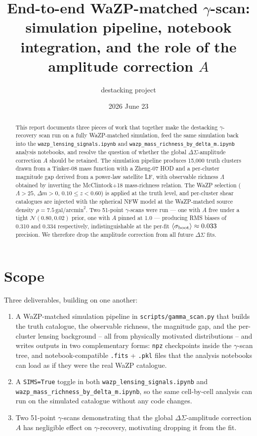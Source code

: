 \documentclass[11pt,a4paper]{article}
\title{\textbf{End-to-end WaZP-matched $\gamma$-scan:\\
simulation pipeline, notebook integration, and the role of the
amplitude correction $A$}}
\author{destacking project}
\date{2026 June 23}
\newcommand{\DS}{\Delta\Sigma}
\begin{document}
\maketitle

\begin{abstract}
This report documents three pieces of work that together make the
destacking $\gamma$-recovery scan run on a fully WaZP-matched
simulation, feed the same simulation back into the
\verb|wazp_lensing_signals.ipynb| and \verb|wazp_mass_richness_by_delta_m.ipynb|
analysis notebooks, and resolve the question of whether the global
$\DS$-amplitude correction $A$ should be retained. The simulation
pipeline produces 15,000 truth clusters drawn from a Tinker-08 mass
function with a Zheng-07 HOD and a per-cluster magnitude gap derived
from a power-law satellite LF, with observable richness $\Lambda$
obtained by inverting the McClintock+18 mass-richness relation. The
WaZP selection ($\Lambda > 25$, $\Delta m > 0$, $0.10 \le z < 0.60$) is
applied at the truth level, and per-cluster shear catalogues are
injected with the spherical NFW model at the WaZP-matched source
density $\rho = 7.5\,\mathrm{gal}/\mathrm{arcmin}^{2}$. Two 51-point
$\gamma$-scans were run --- one with $A$ free under a tight
$\mathcal{N}(0.80, 0.02)$ prior, one with $A$ pinned at 1.0 ---
producing RMS biases of 0.310 and 0.334 respectively, indistinguishable
at the per-fit $\langle\sigma_{\rm boot}\rangle \approx 0.033$
precision. We therefore drop the amplitude correction from all future
$\DS$ fits.
\end{abstract}

\tableofcontents
\bigskip


\section{Scope}
\label{sec:scope}

Three deliverables, building on one another:

\begin{enumerate}
\item A WaZP-matched simulation pipeline in
      \verb|scripts/gamma_scan.py| that builds the truth catalogue, the
      observable richness, the magnitude gap, and the per-cluster
      lensing background -- all from physically motivated distributions
      -- and writes outputs in two complementary forms: \texttt{npz}
      checkpoints inside the $\gamma$-scan tree, and notebook-compatible
      \texttt{.fits} + \texttt{.pkl} files that the analysis notebooks
      can load as if they were the real WaZP catalogue.
\item A \verb|SIMS=True| toggle in both
      \verb|wazp_lensing_signals.ipynb| and
      \verb|wazp_mass_richness_by_delta_m.ipynb|, so the same
      cell-by-cell analysis can run on the simulated catalogue without
      any code changes.
\item Two 51-point $\gamma$-scans demonstrating that the global
      $\DS$-amplitude correction $A$ has negligible effect on
      $\gamma$-recovery, motivating dropping it from the fit.
\end{enumerate}
\end{document}
